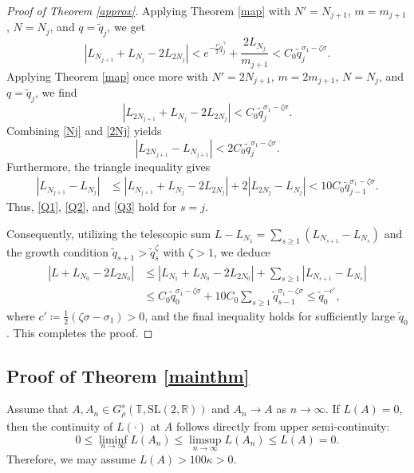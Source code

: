 \documentclass[reqno,12pt]{amsart}
\theoremstyle{plain}
\theoremstyle{definition}
\numberwithin{equation}{section}
\begin{document}
\begin{proof}[Proof of Theorem \ref{approx}]
Applying Theorem \ref{map} with $N'=N_{j+1}$, $m=m_{j+1}$, $N=N_{j}$, and $q=\tilde{q}_{j}$, we get
\begin{equation}\label{Nj}
    |L_{N_{j+1}}+L_{N_{j}}-2L_{2N_{j}}|<e^{-\frac{c}{2}\tilde{q}_{j}^{\gamma}} + \frac{2L_{N_{j}}}{m_{j+1}}<C_{0}\tilde{q}_{j}^{\sigma_{1}-\zeta\sigma}.
\end{equation}
Applying Theorem \ref{map} once more with $N'=2N_{j+1}$, $m=2m_{j+1}$, $N=N_{j}$, and $q=\tilde{q}_{j}$, we find
\begin{equation}\label{2Nj}
    |L_{2N_{j+1}}+L_{N_{j}}-2L_{2N_{j}}|<C_{0}\tilde{q}_{j}^{\sigma_{1}-\zeta\sigma}.
\end{equation}
Combining \eqref{Nj} and \eqref{2Nj} yields
\begin{equation*}
    |L_{2N_{j+1}}-L_{N_{j+1}}|<2C_{0}\tilde{q}_{j}^{\sigma_{1}-\zeta\sigma}.
\end{equation*}
Furthermore, the triangle inequality gives
\begin{equation*}
    \begin{split}
        |L_{N_{j+1}}-L_{N_{j}}|&\leqslant |L_{N_{j+1}}+L_{N_{j}}-2L_{2N_{j}}|+ 2|L_{2N_{j}}-L_{N_{j}}|< 10 C_{0}\tilde{q}_{j-1}^{\sigma_{1}-\zeta\sigma}.
    \end{split}
\end{equation*}
Thus, \eqref{Q1}, \eqref{Q2}, and \eqref{Q3} hold for $s=j$.

Consequently, utilizing the telescopic sum $L - L_{N_1} = \sum_{s\geqslant 1}(L_{N_{s+1}}-L_{N_s})$ and the growth condition $\tilde{q}_{s+1}>\tilde{q}_{s}^{\zeta}$ with $\zeta>1$, we deduce
\begin{equation*}
\begin{split}
    |L+L_{N_{0}}-2L_{2N_{0}}|&\leqslant |L_{N_{1}}+L_{N_{0}}-2L_{2N_{0}}| + \sum_{s\geqslant 1} |L_{N_{s+1}}-L_{N_{s}}|\\
    &\leqslant C_{0}\tilde{q}_{0}^{\sigma_{1}-\zeta\sigma} + 10C_{0}\sum_{s\geqslant 1}\tilde{q}_{s-1}^{\sigma_{1}-\zeta\sigma} \leqslant \tilde{q}_{0}^{-c'},
\end{split}
\end{equation*}
where $c'\coloneq \frac{1}{2}(\zeta\sigma-\sigma_{1})>0$, and the final inequality holds for sufficiently large $\tilde{q}_{0}$. This completes the proof.
\end{proof}




\subsection{Proof of Theorem \ref{mainthm}}
Assume that $A, A_{n}\in G^{s}_{\rho}(\mathbb{T},\mathrm{SL}(2,\mathbb{R}))$ and $A_{n}\to A$ as $n\to \infty$. If $L(A)=0$, then the continuity of $L(\cdot)$ at $A$ follows directly from upper semi-continuity:
\begin{equation*}
    0\leqslant \liminf_{n\to\infty} L(A_{n})\leqslant \limsup_{n\to\infty} L(A_{n})\leqslant L(A)=0.
\end{equation*}
Therefore, we may assume $L(A)>100\kappa>0$. 
\end{document}
